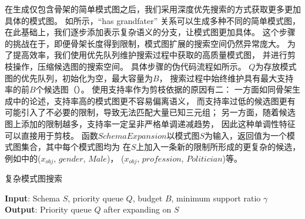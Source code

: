 在生成仅包含骨架的简单模式图之后，我们采用深度优先搜索的方式获取更多更加具体的模式图。
如所示，``has grandfater'' 关系可以生成多种不同的简单模式图，
在此基础上，我们逐步添加表示复杂语义的分支，让模式图更加具体。
这个步骤的挑战在于，即便骨架长度得到限制，模式图扩展的搜索空间仍然异常庞大。
为了提高效率，我们使用优先队列维护搜索过程中获取的高质量模式图，
并进行剪枝操作，压缩候选图的搜索空间。
具体步骤的伪代码流程如所示。
$Q$为存放模式图的优先队列，初始化为空，最大容量为$B$，
搜索过程中始终维护具有最大支持率的前$B$个候选图（）。
使用支持率作为剪枝依据的原因有二：
一方面如同骨架生成中的论述，支持率高的模式图更不容易偏离语义，
而支持率过低的候选图更有可能引入了不必要的限制，导致无法匹配大量已知三元组；
另一方面，随着候选图上添加的限制越多，支持率一定呈非严格单调递减趋势，
因此这种单调性特征可以直接用于剪枝。
函数$SchemaExpansion$以模式图$S$为输入，返回值为一个模式图集合，其中每个模式图均为
在$S$上加入一条新的限制所形成的更复杂的候选，
例如中的($x_{obj}$, $gender$, $Male$)，
($x_{obj}$, $profession$, $Politician$)等。


\begin{algorithm}
\caption{复杂模式图搜索}
\label{alg:schema-dfs}
\textbf{Input}: Schema $S$, priority queue $Q$, budget $B$, minimum support ratio $\gamma$ \\
\textbf{Output}: Priority queue $Q$ after expanding on $S$
\begin{algorithmic}[1]
	\EndIf
			 \label{line:pop}%
		\EndWhile
		 \label{line:exp}
		\EndFor
	\EndIf
	\State {}
\EndProcedure
\end{algorithmic}
\end{algorithm}


